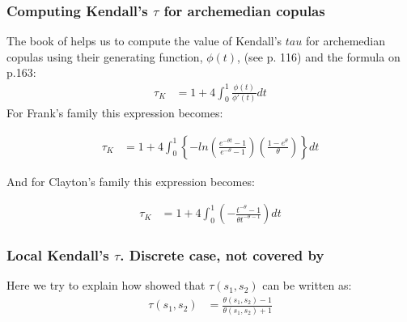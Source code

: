 \documentclass[]{article}
\begin{document}
\subsubsection{Computing Kendall's $\tau$ for archemedian copulas}
The book of \cite{nelsen2007introduction} helps us to compute the value of Kendall's $tau$ for archemedian copulas using their generating function, $\phi(t)$, (see p. 116) and the formula on p.163:
	$$
	\begin{aligned}
		\tau_K &= 1 + 4\int_0^1 \frac{\phi(t)}{\phi'(t)}  dt
	\end{aligned}
	$$
For Frank's family this expression becomes:

	$$
	\begin{aligned}
		\tau_K &= 1 + 4\int_0^1 \left\{   -ln \left(  \frac{e^{-\theta t} - 1}{ e^{-\theta} - 1}  \right) \left(  \frac{ 1 - e^{\theta}}{\theta}  \right) \right\}dt
	\end{aligned}
	$$

And for Clayton's family this expression becomes:

	$$
	\begin{aligned}
		\tau_K &= 1 + 4\int_0^1 \left(-  \frac{t^{-\theta} -  1}{\theta t^{-\theta - 1}}  \right) dt
	\end{aligned}
	$$


\subsubsection{Local Kendall's $\tau$. Discrete case, not covered by \cite{fan2000class}}
\label{deriveWeightedTau}
Here we try to explain how \cite{oakes1989bivariate} showed that $\tau(s_1, s_2)$ can be written as:
	$$
	\begin{aligned}
		\tau(s_1, s_2) &= \frac{\theta(s_1, s_2) - 1}{\theta(s_1, s_2) + 1}
	\end{aligned}
	$$
\end{document}
